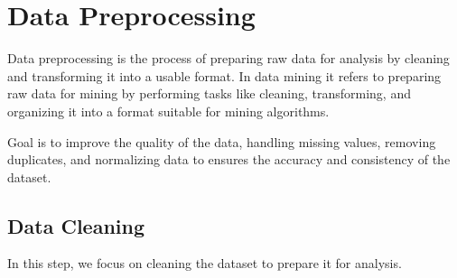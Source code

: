 \section{Data Preprocessing}

Data preprocessing is the process of preparing raw data for analysis by cleaning and transforming it into a usable format. In data mining it refers to preparing raw data for mining by performing tasks like cleaning, transforming, and organizing it into a format suitable for mining algorithms.

Goal is to improve the quality of the data, handling missing values, removing duplicates, and normalizing data to ensures the accuracy and consistency of the dataset.

\subsection{Data Cleaning}

In this step, we focus on cleaning the dataset to prepare it for analysis.

